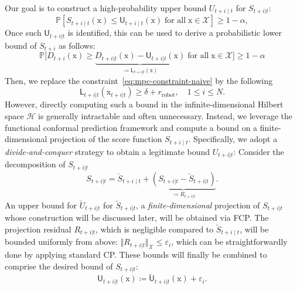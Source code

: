 \documentclass[lettersize,journal]{IEEEtran}
\begin{document}
Our goal is to construct a high-probability upper bound $U_{t+i\mid t}$ for $S_{t+i|t}$:
\begin{equation}\label{eq:coverage-guarantee}
\mathbb{P}\!\left[
S_{t+i\mid t}(\mathrm{x}) \le \mathsf{U}_{t+i\mid t}(\mathrm{x}) \;\text{for all}\; \mathrm{x}\in\mathcal{X}
\right] \ge 1-\alpha,
\end{equation}
Once such $\mathsf{U}_{t+i|t}$ is identified, this can be used to derive a probabilistic lower bound of $S_{t+i}$ as follows:
\begin{equation*}
\mathbb{P}\bigl[ D_{t+i}(\mathrm{x}) \geq \underbrace{D_{t+i|t}(\mathrm{x}) - \mathsf{U}_{t+i|t}(\mathrm{x})}_{\coloneqq \mathsf{L}_{t+i|t}(\mathrm{x})} \;\text{for all}\;  \mathrm{x}\in \mathcal{X}   \bigr] \geq 1 - \alpha
\end{equation*}
Then, we replace the constraint~\eqref{eq:mpc-constraint-naive} by the following
\begin{equation}\label{eq:mpc-constraint-corrected}
\mathsf{L}_{t+i|t}(\mathrm{x}_{t+i|t}) \geq \delta + r_{\text{robot}}, \quad 1\leq i \leq N.
\end{equation}
However, directly computing such a bound in the infinite-dimensional Hilbert
space $\mathscr{H}$ is generally intractable and often unnecessary.
Instead, we leverage the functional conformal prediction framework
\cite{lei2015conformal} and compute a bound on a finite-dimensional projection
of the score function $S_{t+i\mid t}$.
Specifically, we adopt a \emph{divide-and-conquer} strategy to obtain a legitimate bound $U_{t+i|t}$: Consider the decomposition of $S_{t+i|t}$
\begin{equation}\label{eq:score-decomposition}
S_{t+i|t} = \breve{S}_{t+i\mid t} + \underbrace{(S_{t+i|t} - \breve{S}_{t+i|t})}_{\coloneqq R_{t+i|t}}.
\end{equation}
An upper bound for $\breve{U}_{t+i|t}$ for $\breve{S}_{t+i|t}$, a \emph{finite-dimensional} projection of $S_{t+i|t}$ whose construction will be discussed later, will be obtained via FCP. The projection residual $R_{t+i|t}$, which is negligible compared to $\breve{S}_{t+i\mid t}$, will be bounded uniformly from above: $\Vert R_{t+i|t}\Vert_{\mathcal{X}} \leq \varepsilon_i$, which can be straightforwardly done by applying standard CP. These bounds will finally be combined to comprise the desired bound of $S_{t+i|t}$:
\begin{equation}\label{eq:final-envelope}
\mathsf{U}_{t+i|t}(\mathrm{x}) \coloneqq \breve{\mathsf{U}}_{t+i|t}(\mathrm{x}) + \varepsilon_i.
\end{equation}
\end{document}
